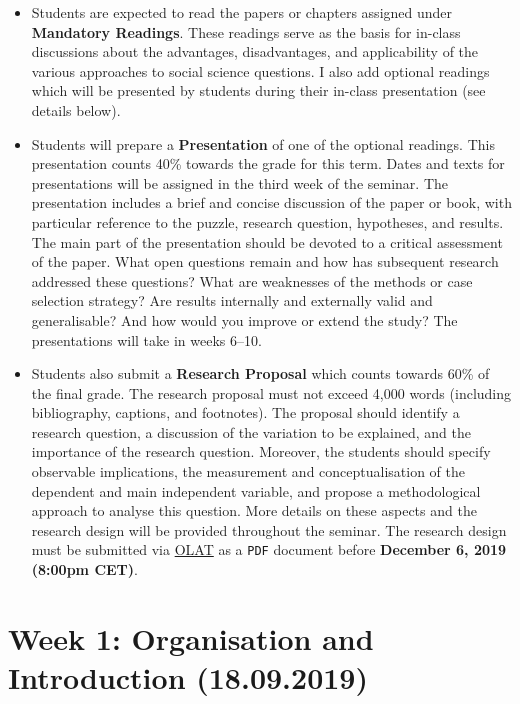\documentclass[abstract=on,parskip=full,headings=standardclasses,fontsize=11pt,paper=a4]{scrartcl}
\begin{document}
\begin{itemize}
\item Students are expected to read the papers or chapters assigned under \textbf{Mandatory Readings}. These readings serve as the basis for in-class discussions about the advantages, disadvantages, and applicability of the various approaches to social science questions. I also add optional readings which will be presented by students during their in-class presentation (see details below). 

\item Students will prepare a  \textbf{Presentation} of one of the optional readings. This presentation counts 40\% towards the grade for this term. Dates and texts for presentations will be assigned in the third week of the seminar. The presentation includes a brief and concise discussion of the paper or book, with particular reference to the puzzle, research question, hypotheses, and results. The main part of the presentation should be devoted to a critical assessment of the paper. What open questions remain and how has subsequent research addressed these questions? What are weaknesses of the methods or case selection strategy? Are results internally and externally valid and generalisable? And how would you improve or extend the study? The presentations will take in weeks 6--10.

\item Students also submit a \textbf{Research Proposal} which counts towards 60\% of the final grade. The research proposal must not exceed 4,000 words  (including bibliography, captions, and footnotes).  The proposal  should identify a  research question, a discussion of the variation to be explained, and the importance of the research question. Moreover, the students should specify observable implications, the measurement and conceptualisation of the dependent and main independent variable, and propose a methodological approach to analyse this question. More details on these aspects and the research design will be provided throughout the seminar. The research design must be submitted via \href{https://lms.uzh.ch}{OLAT} as a \texttt{PDF} document before \textbf{December 6, 2019 (8:00pm CET)}. 
\end{itemize}



\newpage

\tableofcontents

\section{Week 1: Organisation and Introduction (18.09.2019)}
\end{document}
